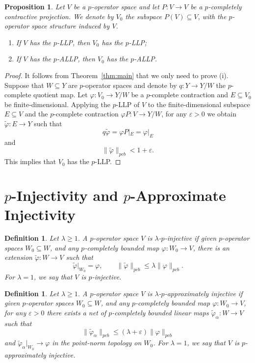 \documentclass[12pt]{article}
\newtheorem{definition}[theorem]{Definition}
\newtheorem{proposition}[theorem]{Proposition}
\newcommand{\pcb}{pcb}
\begin{document}
\begin{proposition}\label{prop:complemented}
Let $V$ be a $p$-operator space and let $P:V\to V$ be a $p$-completely contractive
projection.  We denote by $V_0$ the subspace $P(V)\subseteq V$, with the
$p$-operator space structure induced by $V$.
\begin{enumerate}
        \item[\rm(i)] If $V$ has the $p$-LLP, then $V_0$ has the
                $p$-LLP;
        \item[\rm(ii)] If $V$ has the $p$-ALLP, then $V_0$ has the
                $p$-ALLP.
\end{enumerate}

\end{proposition}

\begin{proof}
It follows from Theorem~\ref{thm:main} that we only need to prove
{\rm(i)}.  Suppose that $W\subseteq Y$ are $p$-operator spaces and denote by $q:Y\to Y/W$ the $p$-complete quotient map.  Let $\varphi:V_0\to Y/W$ be a $p$-complete contraction and $E\subseteq V_0$ be finite-dimensional.  Applying the $p$-LLP of $V$ to the finite-dimensional subspace
$E\subseteq V$ and the $p$-complete contraction $\varphi P: V\to Y/W$, for any $\varepsilon>0$ we obtain
$\widetilde{\varphi}:E\to Y$ such that
\[
        q\widetilde{\varphi}=\varphi P|_E=\varphi|_{E}
\]
and
\[
        \|\widetilde{\varphi}\|_{\pcb}<1+\varepsilon.
\]
This implies that $V_{0}$ has the $p$-LLP.
\end{proof}

\section{$p$-Injectivity and $p$-Approximate Injectivity}

\begin{definition}\label{def:p-injective}
Let $\lambda\geq 1$.  A $p$-operator space $V$ is
\emph{$\lambda$-$p$-injective} if given $p$-operator spaces $W_0\subseteq W$, and any $p$-completely bounded map $\varphi:W_0\to V$, there is an extension
$\widetilde{\varphi}:W\to V$ such that
\[
        \widetilde{\varphi}|_{W_0}=\varphi,\qquad
        \|\widetilde{\varphi}\|_{\pcb}
        \leq\lambda\|\varphi\|_{\pcb}.
\]
For $\lambda=1$, we say that $V$ is $p$-injective.
\end{definition}

\begin{definition}\label{def:approx-p-injective}
Let $\lambda\geq 1$.  A $p$-operator space $V$ is
\emph{$\lambda$-$p$-approximately injective} if given $p$-operator spaces $W_0\subseteq W$, and any $p$-completely bounded map $\varphi:W_0\to V$, for any $\varepsilon>0$
there exists a net of $p$-completely bounded
linear maps $\widetilde{\varphi}_\alpha:W\to V$ such that
\[
        \|\widetilde{\varphi}_\alpha\|_{\pcb}
        \leq(\lambda+\varepsilon)\|\varphi\|_{\pcb}
\]
and $\widetilde{\varphi}_\alpha|_{W_0}\to\varphi$ in the point-norm topology on
$W_0$.
For $\lambda=1$, we say that $V$ is $p$-approximately injective.
\end{definition}
\end{document}
